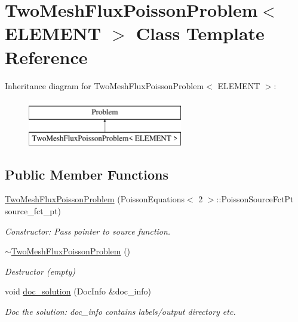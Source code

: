 \hypertarget{classTwoMeshFluxPoissonProblem}{}\section{Two\+Mesh\+Flux\+Poisson\+Problem$<$ E\+L\+E\+M\+E\+NT $>$ Class Template Reference}
\label{classTwoMeshFluxPoissonProblem}
Inheritance diagram for Two\+Mesh\+Flux\+Poisson\+Problem$<$ E\+L\+E\+M\+E\+NT $>$\+:\begin{figure}[H]
\begin{center}
\leavevmode
\includegraphics[height=2.000000cm]{classTwoMeshFluxPoissonProblem}
\end{center}
\end{figure}
\subsection*{Public Member Functions}
\begin{DoxyCompactItemize}
\item 
\hyperlink{classTwoMeshFluxPoissonProblem_ace5a47aa61da5fd2a8761a16ffb3711c}{Two\+Mesh\+Flux\+Poisson\+Problem} (Poisson\+Equations$<$ 2 $>$\+::Poisson\+Source\+Fct\+Pt source\+\_\+fct\+\_\+pt)
\begin{DoxyCompactList}\small\item\em Constructor\+: Pass pointer to source function. \end{DoxyCompactList}\item 
\hyperlink{classTwoMeshFluxPoissonProblem_a03e83ef12db3bf5a1e015c3c3b11337c}{$\sim$\+Two\+Mesh\+Flux\+Poisson\+Problem} ()
\begin{DoxyCompactList}\small\item\em Destructor (empty) \end{DoxyCompactList}\item 
void \hyperlink{classTwoMeshFluxPoissonProblem_a6320ad6d71f24a2d7e03a7bb7e691b31}{doc\+\_\+solution} (Doc\+Info \&doc\+\_\+info)
\begin{DoxyCompactList}\small\item\em Doc the solution\+: doc\+\_\+info contains labels/output directory etc. \end{DoxyCompactList}\end{DoxyCompactItemize}
